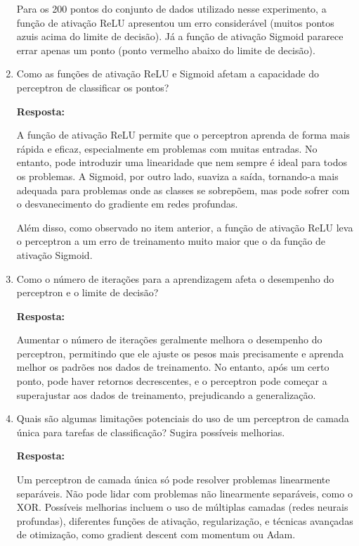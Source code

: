 \documentclass[12 pt]{article}
\begin{document}
\begin{enumerate}
    Para os 200 pontos do conjunto de dados utilizado nesse experimento, a função de ativação ReLU apresentou um erro considerável (muitos pontos azuis acima do limite de decisão). Já a função de ativação Sigmoid pararece errar apenas um ponto (ponto vermelho abaixo do limite de decisão). 

    \item Como as funções de ativação ReLU e Sigmoid afetam a capacidade do perceptron de classificar os pontos?\par

    \textbf{Resposta:} \par

    A função de ativação ReLU permite que o perceptron aprenda de forma mais rápida e eficaz, especialmente em problemas com muitas entradas. No entanto, pode introduzir uma linearidade que nem sempre é ideal para todos os problemas. A Sigmoid, por outro lado, suaviza a saída, tornando-a mais adequada para problemas onde as classes se sobrepõem, mas pode sofrer com o desvanecimento do gradiente em redes profundas.

    Além disso, como observado no item anterior, a função de ativação ReLU leva o perceptron a um erro de treinamento muito maior que o da função de ativação Sigmoid.

    \item Como o número de iterações para a aprendizagem afeta o desempenho do perceptron e o limite de decisão?\par

    \textbf{Resposta:} \par

    Aumentar o número de iterações geralmente melhora o desempenho do perceptron, permitindo que ele ajuste os pesos mais precisamente e aprenda melhor os padrões nos dados de treinamento. No entanto, após um certo ponto, pode haver retornos decrescentes, e o perceptron pode começar a superajustar aos dados de treinamento, prejudicando a generalização.


    \item Quais são algumas limitações potenciais do uso de um perceptron de camada única para tarefas de classificação? Sugira possíveis melhorias.\par

    \textbf{Resposta:} \par

    Um perceptron de camada única só pode resolver problemas linearmente separáveis. Não pode lidar com problemas não linearmente separáveis, como o XOR. Possíveis melhorias incluem o uso de múltiplas camadas (redes neurais profundas), diferentes funções de ativação, regularização, e técnicas avançadas de otimização, como gradient descent com momentum ou Adam.



\end{enumerate}
\end{document}
